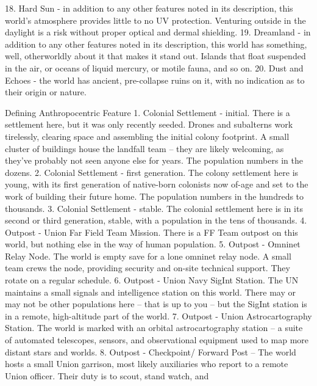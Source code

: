     18. Hard Sun - in addition to any other features noted in its description, this world's
        atmosphere provides little to no UV protection. Venturing outside in the daylight is a risk
        without proper optical and dermal shielding.
    19. Dreamland - in addition to any other features noted in its description, this world has
        something, well, otherworldly about it that makes it stand out. Islands that float suspended
        in the air, or oceans of liquid mercury, or motile fauna, and so on.
    20. Dust and Echoes - the world has ancient, pre-collapse ruins on it, with no indication as to
        their origin or nature.

Defining Anthropocentric Feature
    1.  Colonial Settlement - initial. There is a settlement here, but it was only recently seeded.
        Drones and subalterns work tirelessly, clearing space and assembling the initial colony
        footprint. A small cluster of buildings house the landfall team -- they are likely welcoming,
        as they've probably not seen anyone else for years. The population numbers in the
        dozens.
    2.  Colonial Settlement - first generation. The colony settlement here is young, with its first
        generation of native-born colonists now of-age and set to the work of building their future
        home. The population numbers in the hundreds to thousands.
    3.  Colonial Settlement - stable. The colonial settlement here is in its second or third
        generation, stable, with a population in the tens of thousands.
    4.  Outpost - Union Far Field Team Mission. There is a FF Team outpost on this world, but
        nothing else in the way of human population.
    5.  Outpost - Omninet Relay Node. The world is empty save for a lone omninet relay node. A
        small team crews the node, providing security and on-site technical support. They rotate
        on a regular schedule.
    6.  Outpost - Union Navy SigInt Station. The UN maintains a small signals and intelligence
        station on this world. There may or may not be other populations here -- that is up to you --
        but the SigInt station is in a remote, high-altitude part of the world.
    7.  Outpost - Union Astrocartography Station. The world is marked with an orbital
        astrocartography station -- a suite of automated telescopes, sensors, and observational
        equipment used to map more distant stars and worlds.
    8.  Outpost - Checkpoint/ Forward Post -- The world hosts a small Union garrison, most likely
        auxiliaries who report to a remote Union officer. Their duty is to scout, stand watch, and
